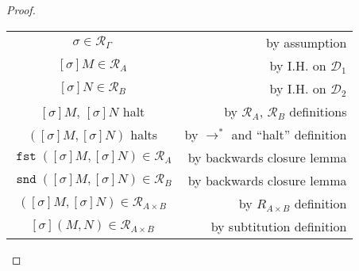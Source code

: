 \documentclass[letterpaper,11pt]{article}
\newcommand{\step}{\rightarrow}
\newcommand{\R}{\mathcal{R}}
\DeclareMathOperator{\fst}{\mathtt{fst}}
\DeclareMathOperator{\snd}{\mathtt{snd}}
\begin{document}
\begin{proof}
\begin{description}
            \begin{center}
                \begin{tabular}{c r}
                    $\sigma \in \R_\Gamma$ &
                    by assumption \\
                    $[\sigma]M \in \R_A$ &
                    by I.H. on $\mathcal{D}_1$ \\
                    $[\sigma]N \in \R_B$ &
                    by I.H. on $\mathcal{D}_2$ \\
                    $[\sigma]M$, $[\sigma]N$ halt &
                    by $\R_A$, $\R_B$ definitions \\
                    $([\sigma]M, [\sigma]N)$ halts &
                    by $\step^*$ and ``halt'' definition \\
                    $\fst{([\sigma]M, [\sigma]N)} \in \R_A$ &
                    by backwards closure lemma \\
                    $\snd{([\sigma]M, [\sigma]N)} \in \R_B$ &
                    by backwards closure lemma \\
                    $([\sigma]M, [\sigma]N) \in \R_{A \times B}$ &
                    by $R_{A \times B}$ definition \\
                    $[\sigma](M, N) \in \R_{A \times B}$ &
                    by subtitution definition
                \end{tabular}
            \end{center}
    \end{description}
\end{proof}
\end{document}
